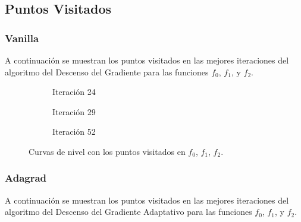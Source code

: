 \newpage
\subsection{Puntos Visitados}

\subsubsection{Vanilla}
A continuación se muestran los puntos visitados en las mejores iteraciones del algoritmo del Descenso del Gradiente para las funciones $f_0$, $f_1$, y $f_2$. \\

\begin{figure}[h!]
     \centering
     \begin{subfigure}[b]{0.45\textwidth}
         \centering
         
         \caption{Iteración 24}
         \label{fig:curvas-vanilla-f-24}
     \end{subfigure}
     \hfill
     \begin{subfigure}[b]{0.45\textwidth}
         \centering
         
         \caption{Iteración 29}
         \label{fig:curvas-vanilla-f1}
     \end{subfigure}
     \hfill
     \begin{subfigure}[b]{0.45\textwidth}
         \centering
         
         \caption{Iteración 52}
         \label{fig:curvas-vanilla-f2}
     \end{subfigure}
        \caption{Curvas de nivel con los puntos visitados en $f_0$, $f_1$, $f_2$.}
        \label{fig:curvas-vanilla}
\end{figure}

\newpage
\subsubsection{Adagrad}
A continuación se muestran los puntos visitados en las mejores iteraciones del algoritmo del Descenso del Gradiente Adaptativo para las funciones $f_0$, $f_1$, y $f_2$. \\

